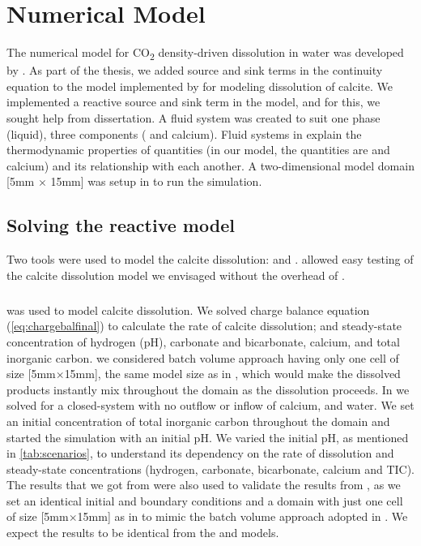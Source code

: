 \chapter{Numerical Model}\label{chapter:numericalmodel}
\thispagestyle{empty}

The numerical model for CO\textsubscript{2} density-driven dissolution in water was developed by 
\citet{Class2020}. As part of the thesis, we added source and sink terms in the continuity equation 
to the  model implemented by \citet{Class2020} for modeling dissolution of calcite. We implemented a 
reactive source and sink term in the model, and for this, we sought help from \citet{hommel2016modeling} dissertation. 
A fluid system was created to suit one phase (liquid), three components ( and calcium). 
Fluid systems in \DuMuX explain the thermodynamic properties of quantities (in our model, the quantities are 
 and calcium) and its relationship with each another. A two-dimensional model domain [5mm $\times$ 15mm] 
was setup in \DuMuX to run the simulation.

\section{Solving the reactive model}
Two tools were used to model the calcite dissolution: \MATLAB and \DuMuX. \MATLAB allowed easy testing of the 
calcite dissolution model we envisaged without the overhead of \DuMuX.

\paragraph*{\MATLAB} was used to model calcite dissolution. We solved charge balance equation (\ref{eq:chargebalfinal}) 
to calculate the rate of calcite dissolution; and steady-state concentration of hydrogen (pH), carbonate and bicarbonate, 
calcium, and total inorganic carbon. we considered batch volume approach having only one cell of size [5mm$\times$15mm], 
the same model size as in \DuMuX, which would make the dissolved products instantly mix throughout the domain as 
the dissolution proceeds. In \MATLAB we solved for a closed-system with no outflow or inflow of calcium,  and water. 
We set an initial concentration of total inorganic carbon throughout the domain and started the simulation with an initial pH. 
We varied the initial pH, as mentioned in \cref{tab:scenarios}, to understand its dependency on the rate of dissolution and 
steady-state concentrations (hydrogen, carbonate, bicarbonate, calcium and TIC). The results that we got from \MATLAB were 
also used to validate the results from \DuMuX, as we set an identical initial and boundary conditions and a domain with just 
one cell of size [5mm$\times$15mm] as in \DuMuX to mimic the batch volume approach adopted in \MATLAB. We expect the results 
to be identical from the \MATLAB and \DuMuX models. \\

